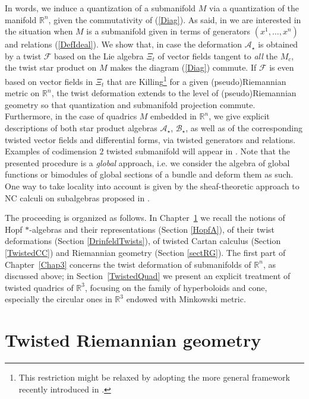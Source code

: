 \documentclass[a4paper,11pt]{article}
\newcommand{\RR}{\mathbb{R}}
\newcommand{\M}{\sf{M}}
\begin{document}
In words, we induce a quantization of a submanifold $M$
via a quantization of the manifold $\mathbb{R}^n$, given the commutativity of (\ref{Diag}).
As said, in \cite{FioFraWebquadrics,FioreWeber} we are interested in
the situation when
$M$ is a submanifold given in terms of generators $(x^1,\ldots,x^n)$ and relations
(\ref{DefIdeal}).
We show that, in case the deformation $\mathcal{A}_\star$ is obtained by
a twist $\mathcal{F}$ based on the Lie algebra $\Xi_t$ of vector fields tangent to {\it all} the $M_c$,
the twist star product on $M$ makes the diagram (\ref{Diag}) commute. If $\mathcal{F}$
is even based on vector fields in $\Xi_t$ that are Killing\footnote{This restriction might be relaxed
by adopting the more general framework recently introduced in \cite{Aschieri2020}.} 
for a given (pseudo)Riemannian metric on $\mathbb{R}^n$,
the twist deformation extends to the level of (pseudo)Riemannian geometry so that
quantization and submanifold projection commute.
Furthermore, in the case of quadrics $M$ embedded in $\RR^n$,
we give explicit descriptions of both star product algebras  $\mathcal{A}_\star$, $\mathcal{B}_\star$,
as well as of the corresponding twisted vector fields and differential forms, via twisted generators and
relations. Examples of  codimension $2$ twisted submanifold will appear in \cite{GTCodimension2}. 
Note that the presented procedure is a \textit{global} approach,
i.e. we consider the algebra of global functions or bimodules of global sections of a bundle and deform them as such. One way to take locality into account is
given by the sheaf-theoretic approach to NC calculi on subalgebras proposed in
\cite{AschieriFioresiLatiniWeber2021}.


The proceeding is organized as follows. In Chapter~\ref{Chap2} we  recall the notions of
Hopf $*$-algebras and their representations (Section \ref{HopfA}), of their  twist deformations (Section \ref{DrinfeldTwists}), 
of twisted Cartan calculus (Section \ref{TwistedCC}) and Riemannian geometry (Section \ref{sectRG}).
The first part of Chapter~\ref{Chap3} concerns the twist deformation of submanifolds of $\mathbb{R}^n$,
as discussed above;  in  Section~\ref{TwistedQuad}
we present an explicit treatment of twisted quadrics of $\mathbb{R}^3$, focusing on the family of hyperboloids and cone, especially the circular ones in $\RR^3$ endowed with Minkowski metric.


\section{Twisted Riemannian geometry}\label{Chap2}
\end{document}
